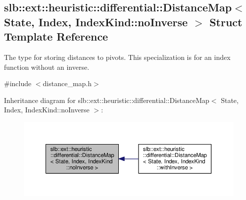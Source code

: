 \hypertarget{structslb_1_1ext_1_1heuristic_1_1differential_1_1DistanceMap_3_01State_00_01Index_00_01IndexKind_1_1noInverse_01_4}{}\subsection{slb\+:\+:ext\+:\+:heuristic\+:\+:differential\+:\+:Distance\+Map$<$ State, Index, Index\+Kind\+:\+:no\+Inverse $>$ Struct Template Reference}
\label{structslb_1_1ext_1_1heuristic_1_1differential_1_1DistanceMap_3_01State_00_01Index_00_01IndexKind_1_1noInverse_01_4}


The type for storing distances to pivots. This specialization is for an index function without an inverse.  




{\ttfamily \#include $<$distance\+\_\+map.\+h$>$}



Inheritance diagram for slb\+:\+:ext\+:\+:heuristic\+:\+:differential\+:\+:Distance\+Map$<$ State, Index, Index\+Kind\+:\+:no\+Inverse $>$\+:\nopagebreak
\begin{figure}[H]
\begin{center}
\leavevmode
\includegraphics[width=350pt]{structslb_1_1ext_1_1heuristic_1_1differential_1_1DistanceMap_3_01State_00_01Index_00_01IndexKinde43ce932d9787cf913052e8d1057cce1}
\end{center}
\end{figure}
